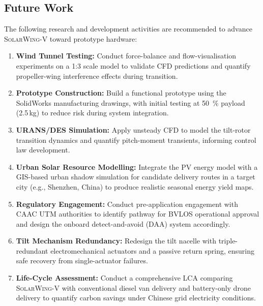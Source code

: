 \documentclass[conference]{IEEEtran}
\newcommand{\UAV}{\textsc{SolarWing-V}}          %
\begin{document}
\subsection{Future Work}

The following research and development activities are recommended to advance
\UAV{} toward prototype hardware:

\begin{enumerate}
    \item \textbf{Wind Tunnel Testing:} Conduct force-balance and flow-visualisation
          experiments on a 1:3 scale model to validate CFD predictions and quantify
          propeller-wing interference effects during transition.

    \item \textbf{Prototype Construction:} Build a functional prototype using the
          SolidWorks manufacturing drawings, with initial testing at \SI{50}{\%}
          payload (2.5\,kg) to reduce risk during system integration.

    \item \textbf{URANS/DES Simulation:} Apply unsteady CFD to model the tilt-rotor
          transition dynamics and quantify pitch-moment transients, informing
          control law development.

    \item \textbf{Urban Solar Resource Modelling:} Integrate the PV energy model
          with a GIS-based urban shadow simulation for candidate delivery routes
          in a target city (e.g., Shenzhen, China) to produce realistic seasonal
          energy yield maps.

    \item \textbf{Regulatory Engagement:} Conduct pre-application engagement with
          CAAC UTM authorities to identify pathway for BVLOS operational approval
          and design the onboard detect-and-avoid (DAA) system accordingly.

    \item \textbf{Tilt Mechanism Redundancy:} Redesign the tilt nacelle with
          triple-redundant electromechanical actuators and a passive return spring,
          ensuring safe recovery from single-actuator failures.

    \item \textbf{Life-Cycle Assessment:} Conduct a comprehensive LCA comparing
          \UAV{} with conventional diesel van delivery and battery-only drone
          delivery to quantify carbon savings under Chinese grid electricity conditions.
\end{enumerate}
\end{document}
